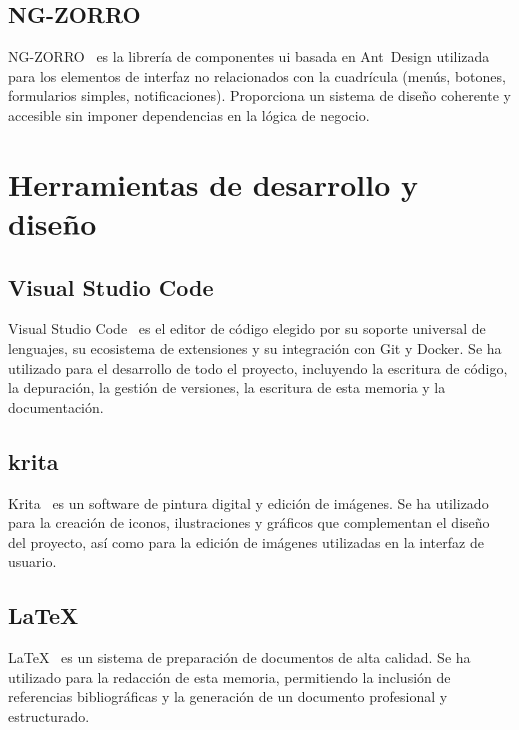 \subsection{NG-ZORRO}
NG-ZORRO~\cite{ngzorro} es la librería de componentes \gls{ui} basada en Ant~Design
utilizada para los elementos de interfaz no relacionados con la cuadrícula (menús, botones,
formularios simples, notificaciones). Proporciona un sistema de diseño coherente y
accesible sin imponer dependencias en la lógica de negocio.

\section{Herramientas de desarrollo y diseño}
\subsection{Visual Studio Code}
Visual Studio Code~\cite{vscode} es el editor de código elegido por su soporte universal de lenguajes,
su ecosistema de extensiones y su integración con Git y Docker. Se ha utilizado para el desarrollo de todo el 
proyecto, incluyendo la escritura de código, la depuración, la gestión de versiones, la escritura de esta memoria
y la documentación.

\subsection{krita}
Krita~\cite{krita} es un software de pintura digital y edición de imágenes. Se ha utilizado para la creación
 de iconos, ilustraciones y gráficos que complementan el diseño del proyecto, 
 así como para la edición de imágenes utilizadas en la interfaz de usuario.

\subsection{LaTeX}
LaTeX~\cite{latex} es un sistema de preparación de documentos de alta calidad. 
Se ha utilizado para la redacción de esta memoria, permitiendo la inclusión de  referencias bibliográficas
 y la generación de un documento profesional y estructurado.
